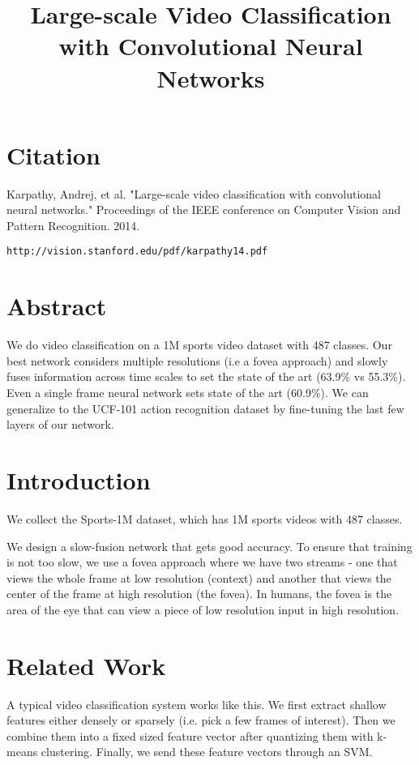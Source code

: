 \documentclass[a4paper]{article}
\title{Large-scale Video Classification with Convolutional Neural Networks}
\date{}
\begin{document}
\maketitle

\section{Citation}
Karpathy, Andrej, et al. "Large-scale video classification with convolutional neural networks." Proceedings of the IEEE conference on Computer Vision and Pattern Recognition. 2014.

\begin{verbatim}
http://vision.stanford.edu/pdf/karpathy14.pdf 
\end{verbatim}

\section{Abstract}
We do video classification on a 1M sports video dataset with 487 classes. Our
best network considers multiple resolutions (i.e a fovea approach) and slowly
fuses information across time scales to set the state of the art (63.9\% vs
55.3\%). Even a single frame neural network sets state of the art (60.9\%). We
can generalize to the UCF-101 action recognition dataset by fine-tuning the
last few layers of our network.

\section{Introduction}
We collect the Sports-1M dataset, which has 1M sports videos with 487 classes.

We design a slow-fusion network that gets good accuracy. To ensure that training
is not too slow, we use a fovea approach where we have two streams - one that
views the whole frame at low resolution (context) and another that views the 
center of the frame at high resolution (the fovea). In humans, the fovea is the 
area of the  eye that can view a piece of low resolution input in high 
resolution.

\section{Related Work}
A typical video classification system works like this. We first extract
shallow features either densely or sparsely (i.e. pick a few frames of 
interest). Then we combine them into a fixed sized feature vector after 
quantizing them with k-means clustering. Finally, we send these feature
vectors through an SVM.
\end{document}
